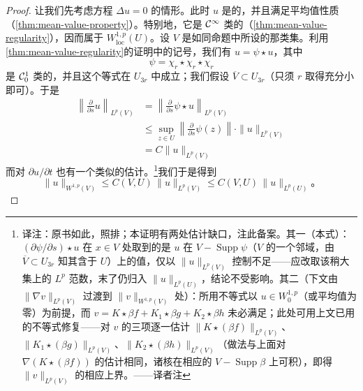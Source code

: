 \begin{proof}
让我们先考虑方程 $\Delta u=0$ 的情形。此时 $u$ 是\trHarmonic{}的，并且满足平均值性质（\cref{thm:mean-value-property}）。特别地，它是 $\mathcal{C}^{\infty}$ 类的（\cref{thm:mean-value-regularity}），因而属于 $W^{1,p}_{\mathrm{loc}}(U)$。设 $V$ 是如同命题中所设的那类\trOpen{}集。利用\cref{thm:mean-value-regularity}的证明中的记号，我们有 $u=\psi\star u$，其中
\[
\psi=\chi_{r}\star\chi_{r}\star\chi_{r}
\]
是 $\mathcal{C}^{1}_{0}$ 类的，并且这个等式在 $U_{3r}$ 中成立；我们假设 $\overline{V}\subset U_{3r}$（只须 $r$ 取得充分小即可）。于是
\[
\begin{aligned}
\left\|\frac{\partial}{\partial s}u\right\|_{L^{p}(V)}&=\left\|\frac{\partial}{\partial s}\psi\star u\right\|_{L^{p}(V)}\\
&\le\sup_{z\in U}\left\|\frac{\partial}{\partial s}\psi(z)\right\|\cdot\|u\|_{L^{p}(V)}\\
&=C\|u\|_{L^{p}(V)}
\end{aligned}
\]
而对 $\partial u/\partial t$ 也有一个类似的估计。\footnote{译注：原书如此，照排；本证明有两处估计缺口，注此备案。其一（本式）：\trConvolution{} $(\partial\psi/\partial s)\star u$ 在 $x\in V$ 处取到的是 $u$ 在 $V-\operatorname{Supp}\psi$（$V$ 的一个邻域，由 $\overline{V}\subset U_{3r}$ 知其含于 $U$）上的值，仅以 $\|u\|_{L^{p}(V)}$ 控制不足——应改取该稍大集上的 $L^{p}$ 范数，末了仍归入 $\|u\|_{L^{p}(U)}$，结论不受影响。其二（下文由 $\|\nabla v\|_{L^{p}(V)}$ 过渡到 $\|v\|_{W^{1,p}(V)}$ 处）：所用\trPoincare{}不等式以 $u\in W^{1,p}_{0}$（或平均值为零）为前提，而 $v=K\star\beta f+K_{1}\star\beta g+K_{2}\star\beta h$ 未必满足；此处可用上文已用的\trYoung{}不等式修复——对 $v$ 的三项逐一估计 $\|K\star(\beta f)\|_{L^{p}(V)}$、$\|K_{1}\star(\beta g)\|_{L^{p}(V)}$、$\|K_{2}\star(\beta h)\|_{L^{p}(V)}$（做法与上面对 $\nabla(K\star(\beta f))$ 的估计相同，诸核在相应的 $V-\operatorname{Supp}\beta$ 上可积），即得 $\|v\|_{L^{p}(V)}$ 的相应上界。——译者注}我们于是得到
\[
\|u\|_{W^{1,p}(V)}\le C(V,U)\,\|u\|_{L^{p}(V)}\le C(V,U)\,\|u\|_{L^{p}(U)}\text{。}
\]


\end{proof}
